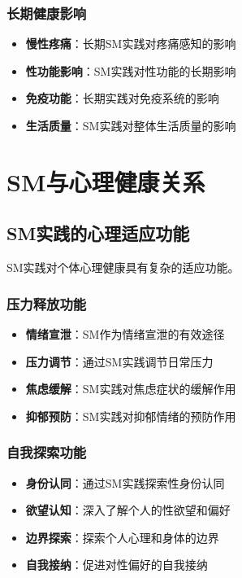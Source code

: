 \documentclass[12pt,UTF8]{ctexbook}
\begin{document}
\subsection{长期健康影响}
\begin{itemize}[leftmargin=2cm]
	\item \textbf{慢性疼痛}：长期SM实践对疼痛感知的影响
	\item \textbf{性功能影响}：SM实践对性功能的长期影响
	\item \textbf{免疫功能}：长期实践对免疫系统的影响
	\item \textbf{生活质量}：SM实践对整体生活质量的影响
\end{itemize}

\chapter{SM与心理健康关系}
\section{SM实践的心理适应功能}
SM实践对个体心理健康具有复杂的适应功能。

\subsection{压力释放功能}
\begin{itemize}[leftmargin=2cm]
	\item \textbf{情绪宣泄}：SM作为情绪宣泄的有效途径
	\item \textbf{压力调节}：通过SM实践调节日常压力
	\item \textbf{焦虑缓解}：SM实践对焦虑症状的缓解作用
	\item \textbf{抑郁预防}：SM实践对抑郁情绪的预防作用
\end{itemize}

\subsection{自我探索功能}
\begin{itemize}[leftmargin=2cm]
	\item \textbf{身份认同}：通过SM实践探索性身份认同
	\item \textbf{欲望认知}：深入了解个人的性欲望和偏好
	\item \textbf{边界探索}：探索个人心理和身体的边界
	\item \textbf{自我接纳}：促进对性偏好的自我接纳
\end{itemize}
\end{document}
